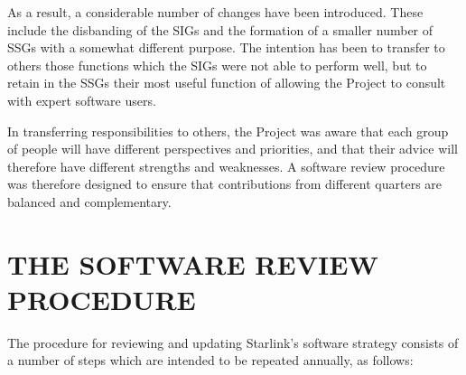 \documentclass[11pt]{article}
\newcommand{\htmlref}[2]{#1}
\newcommand{\xlabel}[1]{}
\begin{document}
As a result, a considerable number of changes have been introduced.
These include the disbanding of the SIGs and the formation of a
smaller number of SSGs with a somewhat \htmlref{different
purpose}{sect:comparison}. The intention has been to transfer to
others those functions which the SIGs were not able to perform well,
but to retain in the SSGs their most useful function of allowing the
Project to consult with expert software users.

In transferring responsibilities to others, the Project was aware that
each group of people will have different perspectives and priorities,
and that their advice will therefore have different strengths and
weaknesses. A software review \htmlref{procedure}{sect:procedure} was
therefore designed to ensure that contributions from different
quarters are balanced and complementary.

\section{\xlabel{review_procedure}\label{sect:procedure}THE SOFTWARE REVIEW PROCEDURE}

The procedure for reviewing and updating Starlink's software strategy
consists of a number of steps which are intended to be repeated
annually, as follows:
\end{document}
